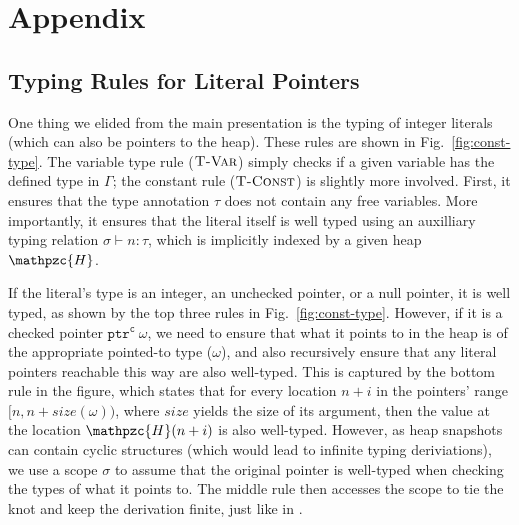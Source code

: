 \documentclass[conference]{IEEEtran}
\newcommand{\tptr}[2]{\ensuremath{\mathtt{ptr}^{#2}~{#1}}}
\newcommand{\heap}{\ensuremath{\mathpzc{H}}}
\newcommand{\size}{\mathit{size}}
\newcommand{\cmode}{\texttt{c}}
\begin{document}






\begin{small}

\end{small}
\newpage
\appendix
\section{Appendix}

\subsection{Typing Rules for Literal Pointers}\label{sec:literal-pointer-typing}

One thing we elided from the main presentation is the typing of
integer literals (which can also be pointers to the heap). These rules
are shown in Fig.~\ref{fig:const-type}. The variable type rule
($\textsc{T-Var}$) simply checks if a given variable has the defined
type in $\Gamma$; the constant rule ($\textsc{T-Const}$) is slightly
more involved.  First, it ensures that the type annotation $\tau$ does
not contain any free variables. More importantly, it ensures that the
literal itself is well typed using an auxilliary typing relation
$\sigma \vdash n : \tau$, which is implicitly indexed by a given heap
$\heap$.

If the literal's type is an integer, an unchecked pointer, or a null
pointer, it is well typed, as shown by the top three rules in
Fig.~\ref{fig:const-type}. However, if it is a checked pointer
$\tptr{\omega}{\cmode}$, we need to ensure that what it points to in
the heap is of the appropriate pointed-to type ($\omega$), and also
recursively ensure that any literal pointers reachable this way are
also well-typed. This is captured by the bottom rule in the figure,
which states that for every location $n+i$ in the pointers' range
$[n, n+\size(\omega))$, where $\size$ yields the size of its argument,
  then the value at the location $\heap(n+i)$ is also well-typed.
  However, as heap snapshots can contain cyclic structures (which
  would lead to infinite typing deriviations), we use a scope $\sigma$
  to assume that the original pointer is well-typed when checking the
  types of what it points to. The middle rule then accesses the scope
  to tie the knot and keep the derivation finite, just like in
  \citet{ruef18checkedc-incr}.
  
\end{document}
